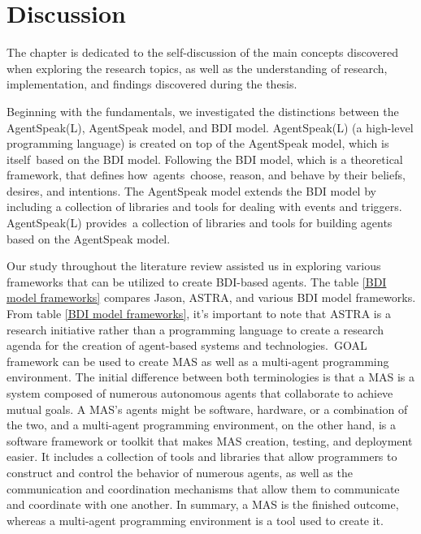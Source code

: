 {\chapter{Discussion}}
\label{sec:discussion}
The chapter is dedicated to the self-discussion of the main concepts discovered when exploring the research topics, as well as the understanding of research, implementation, and findings discovered during the thesis.

\vspace{.5cm}

Beginning with the fundamentals, we investigated the distinctions between the AgentSpeak(L), AgentSpeak model, and \ac{BDI} model. AgentSpeak(L) (a high-level programming language) is created on top of the AgentSpeak model, which is itself based on the \ac{BDI} model. Following the \ac{BDI} model, which is a theoretical framework, that defines how agents choose, reason, and behave by their beliefs, desires, and intentions. The AgentSpeak model extends the \ac{BDI} model by including a collection of libraries and tools for dealing with events and triggers. AgentSpeak(L) provides a collection of libraries and tools for building agents based on the AgentSpeak model.

\vspace{.5cm}

Our study throughout the literature review assisted us in exploring various frameworks that can be utilized to create \ac{BDI}-based agents. The table \ref{BDI model frameworks} compares Jason, ASTRA, and various \ac{BDI} model frameworks. From table \ref{BDI model frameworks}, it's important to note that ASTRA is a research initiative rather than a programming language to create a research agenda for the creation of agent-based systems and technologies. GOAL framework can be used to create \ac{MAS} as well as a multi-agent programming environment. The initial difference between both terminologies is that a \ac{MAS} is a system composed of numerous autonomous agents that collaborate to achieve mutual goals. A \ac{MAS}'s agents might be software, hardware, or a combination of the two, and a multi-agent programming environment, on the other hand, is a software framework or toolkit that makes \ac{MAS} creation, testing, and deployment easier. It includes a collection of tools and libraries that allow programmers to construct and control the behavior of numerous agents, as well as the communication and coordination mechanisms that allow them to communicate and coordinate with one another. In summary, a \ac{MAS} is the finished outcome, whereas a multi-agent programming environment is a tool used to create it.

